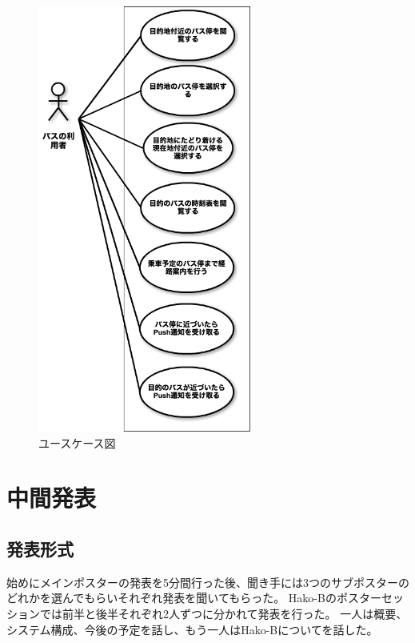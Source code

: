 \documentclass[openany,11pt,papersize]{jsbook}
\begin{document}
\begin{figure}[htbp]
  \begin{center}
    \includegraphics[clip,width=7.0cm]{img/usecase.png}
    \caption{ユースケース図}
    \label{fig:usecase}
  \end{center}
\end{figure}


\chapter{中間発表}

\section{発表形式}
始めにメインポスターの発表を5分間行った後、聞き手には3つのサブポスターのどれかを選んでもらいそれぞれ発表を聞いてもらった。
Hako-Bのポスターセッションでは前半と後半それぞれ2人ずつに分かれて発表を行った。
一人は概要、システム構成、今後の予定を話し、もう一人はHako-Bについてを話した。

\end{document}
